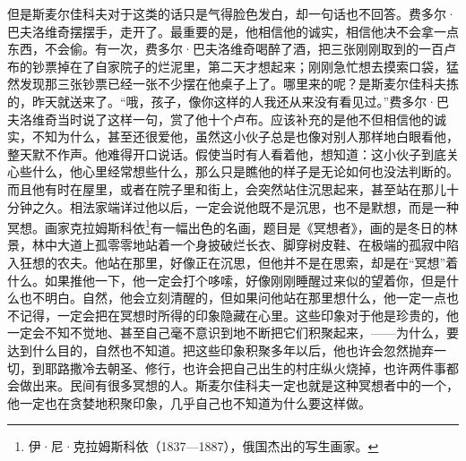 \par 但是斯麦尔佳科夫对于这类的话只是气得脸色发白，却一句话也不回答。费多尔·巴夫洛维奇摆摆手，走开了。最重要的是，他相信他的诚实，相信他决不会拿一点东西，不会偷。有一次，费多尔·巴夫洛维奇喝醉了酒，把三张刚刚取到的一百卢布的钞票掉在了自家院子的烂泥里，第二天才想起来；刚刚急忙想去摸索口袋，猛然发现那三张钞票已经一张不少摆在他桌子上了。哪里来的呢？是斯麦尔佳科夫拣的，昨天就送来了。“哦，孩子，像你这样的人我还从来没有看见过。”费多尔·巴夫洛维奇当时说了这样一句，赏了他十个卢布。应该补充的是他不但相信他的诚实，不知为什么，甚至还很爱他，虽然这小伙子总是也像对别人那样地白眼看他，整天默不作声。他难得开口说话。假使当时有人看着他，想知道：这小伙子到底关心些什么，他心里经常想些什么，那么只是瞧他的样子是无论如何也没法判断的。而且他有时在屋里，或者在院子里和街上，会突然站住沉思起来，甚至站在那儿十分钟之久。相法家端详过他以后，一定会说他既不是沉思，也不是默想，而是一种冥想。画家克拉姆斯科依\footnote{伊·尼·克拉姆斯科依（1837—1887），俄国杰出的写生画家。}有一幅出色的名画，题目是《冥想者》，画的是冬日的林景，林中大道上孤零零地站着一个身披破烂长衣、脚穿树皮鞋、在极端的孤寂中陷入狂想的农夫。他站在那里，好像正在沉思，但他并不是在思索，却是在“冥想”着什么。如果推他一下，他一定会打个哆嗦，好像刚刚睡醒过来似的望着你，但是什么也不明白。自然，他会立刻清醒的，但如果问他站在那里想什么，他一定一点也不记得，一定会把在冥想时所得的印象隐藏在心里。这些印象对于他是珍贵的，他一定会不知不觉地、甚至自己毫不意识到地不断把它们积聚起来，——为什么，要达到什么目的，自然也不知道。把这些印象积聚多年以后，他也许会忽然抛弃一切，到耶路撒冷去朝圣、修行，也许会把自己出生的村庄纵火烧掉，也许两件事都会做出来。民间有很多冥想的人。斯麦尔佳科夫一定也就是这种冥想者中的一个，他一定也在贪婪地积聚印象，几乎自己也不知道为什么要这样做。
